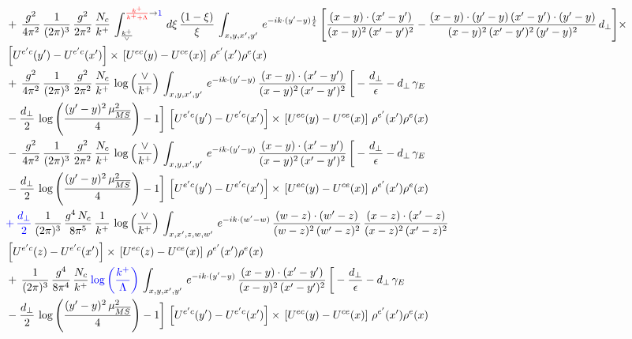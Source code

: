 \documentclass[10pt]{article}
\newcommand{\new}[1]{{\color{blue}#1}}
\newcommand{\old}[1]{{\color{red}#1}}
\begin{document}
\begin{align}
& +\,\frac{g^{2}}{4\pi^{2}}\, \frac{1}{(2\pi)^{3}}\,\frac{g^{2}}{2\pi^{2}}\, \frac{N_{c}}{k^{+}}\,\int_{\frac{k^{+}}{\vee}}^{\old{\frac{k^{+}}{k^{+}+\Lambda}}\to\new{1}}\,d\xi\, \frac{(1-\xi)}{\xi}\, \int_{x,y,x',y'}\,e^{-ik\cdot (y'-y)\frac{1}{\xi}}\,\Bigg[\frac{(x-y)\cdot (x'-y')}{(x-y)^{2}\, (x'-y')^{2}} -\frac{(x-y)\cdot (y'-y)\, (x'-y')\cdot (y'-y)}{(x-y)^{2}\,(x'-y')^{2}\,(y'-y)^{2}}\,d_{\perp}\Bigg]\times\notag \\ &  \left[U^{e'c}(y') - U^{e'c}(x')\right] \times\, \left[U^{ec}(y) - U^{ce}(x)\right]\, \rho^{e'}(x') \rho^{e}(x) \notag \\ & +\, \frac{g^{2}}{4\pi^{2}}\, \frac{1}{(2\pi)^{3}}\,\frac{g^{2}}{2\pi^{2}}\, \frac{N_{c}}{k^{+}}\,\log{\left(\frac{\vee}{k^{+}}\right)}\,\int_{x,y,x',y'}\,e^{-ik\cdot (y'-y)}\,\frac{(x-y)\cdot (x'-y')}{(x-y)^{2}\,(x'-y')^{2}}\,\bigg[-\frac{d_{\perp}}{\epsilon}-d_{\perp}\,\gamma_{E}\notag \\ & -\frac{d_{\perp}}{2}\,\log{\left(\frac{(y'-y)^{2}\,\mu^{2}_{\overline{MS}}}{4}\right)}-1\bigg]\,\left[U^{e'c}(y') - U^{e'c}(x')\right] \times\, \left[U^{ec}(y) - U^{ce}(x)\right]\, \rho^{e'}(x') \rho^{e}(x) \notag \\
&   -\, \frac{g^{2}}{4\pi^{2}}\, \frac{1}{(2\pi)^{3}}\,\frac{g^{2}}{2\pi^{2}}\, \frac{N_{c}}{k^{+}}\,\log{\left(\frac{\vee}{k^{+}}\right)}\,\int_{x,y,x',y'}\,e^{-ik\cdot (y'-y)}\,\frac{(x-y)\cdot (x'-y')}{(x-y)^{2}\,(x'-y')^{2}}\,\bigg[-\frac{d_{\perp}}{\epsilon}-d_{\perp}\,\gamma_{E}\notag \\ &   -\frac{d_{\perp}}{2}\,\log{\left(\frac{(y'-y)^{2}\,\mu^{2}_{\overline{MS}}}{4}\right)}-1\bigg]\,\left[U^{e'c}(y') - U^{e'c}(x')\right] \times\, \left[U^{ec}(y) - U^{ce}(x)\right]\, \rho^{e'}(x') \rho^{e}(x) \notag \\
&   \new{+\,\frac{d_{\perp}}{2}}\,\frac{1}{(2\pi)^{3}}\,\frac{g^{4}\,N_{c}}{8\pi^{5}}\,\frac{1}{k^{+}}\,\log{\left(\frac{\vee}{k^{+}}\right)}\,\int_{x,x',z,w,w'}\,e^{-ik\cdot (w'-w)}\,\frac{(w-z)\cdot(w'-z)}{(w-z)^{2}\,(w'-z)^{2}}\,\frac{(x-z)\cdot(x'-z)}{(x-z)^{2}\,(x'-z)^{2}}\notag \\ &   \left[U^{e'c}(z) - U^{e'c}(x')\right] \times\, \left[U^{ec}(z) - U^{ce}(x)\right]\, \rho^{e'}(x') \rho^{e}(x) \notag \\ & +\,\frac{1}{(2\pi)^{3}}\,\frac{g^{4}}{8\pi^{4}}\, \frac{N_{c}}{k^{+}}\,{\color{blue}\log{\left(\frac{k^{+}}{\Lambda}\right)}}\,\int_{x,y,x',y'}\,e^{-ik\cdot (y'-y)}\,\frac{(x-y)\cdot (x'-y')}{(x-y)^{2}\,(x'-y')^{2}}\,\bigg[-\frac{d_{\perp}}{\epsilon}-d_{\perp}\,\gamma_{E}\notag \\ & -\frac{d_{\perp}}{2}\,\log{\left(\frac{(y'-y)^{2}\,\mu^{2}_{\overline{MS}}}{4}\right)}-1\bigg]\,\left[U^{e'c}(y') - U^{e'c}(x')\right] \times\, \left[U^{ec}(y) - U^{ce}(x)\right]\, \rho^{e'}(x') \rho^{e}(x)
\end{align}
\end{document}
